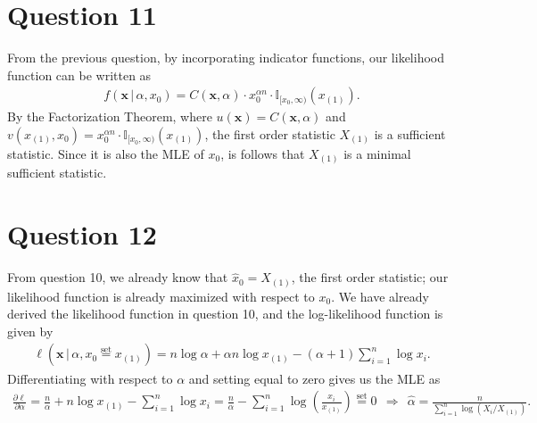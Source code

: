 \documentclass[10pt]{article}
\begin{document}
\section{Question 11} \noindent
From the previous question, by incorporating indicator functions, our likelihood function can be written as 
\begin{align*}
    f(\mathbf{x} \,|\, \alpha, x_0)
    = C(\mathbf{x}, \alpha) \cdot x_0^{\alpha n} \cdot \mathbb{I}_{[x_0, \infty)}(x_{(1)}).
\end{align*}
By the Factorization Theorem, where \(u(\mathbf{x}) = C(\mathbf{x}, \alpha)\) and \(v(x_{(1)}, x_0) = x_0^{\alpha n} \cdot \mathbb{I}_{[x_0, \infty)}(x_{(1)})\),
the first order statistic \(X_{(1)}\) is a sufficient statistic. Since it is also the MLE of \(x_0\), is follows that \(X_{(1)}\) is a minimal
sufficient statistic.

\section{Question 12} \noindent
From question 10, we already know that \(\hat{x}_0 = X_{(1)}\), the first order statistic; our likelihood function is already maximized with respect to \(x_0\).
We have already derived the likelihood function in question 10, and the log-likelihood function is given by 
\begin{align*}
    \ell(\mathbf{x} \,|\, \alpha, x_0 \overset{\text{set}}{=} x_{(1)})
    = n \log \alpha + \alpha n \log x_{(1)} - (\alpha + 1) \sum_{i=1}^n \log x_i.
\end{align*}
Differentiating with respect to \(\alpha\) and setting equal to zero gives us the MLE as 
\begin{align*}
    \frac{\partial \ell}{\partial \alpha}
    = \frac{n}{\alpha} + n \log x_{(1)} - \sum_{i=1}^n \log x_i
    = \frac{n}{\alpha} - \sum_{i=1}^n \log \left( \frac{x_i}{x_{(1)}} \right)
    \overset{\text{set}}{=} 0
    ~~\Longrightarrow~~
    \hat{\alpha} = \frac{n}{\sum_{i=1}^n \log(X_i / X_{(1)})}.
\end{align*}

\end{document}
